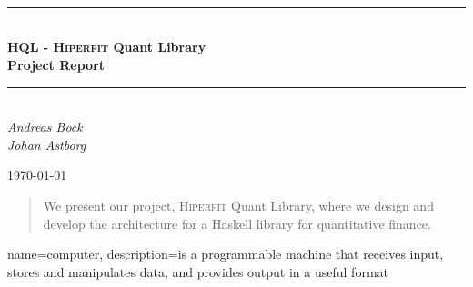 \documentclass[a4paper,11pt]{scrreprt}
\def\Title{\bf HQL - \textsc{Hiperfit} Quant Library\\ {\Large Project Report}}
\newcommand{\HRule}{\rule{\linewidth}{0.5mm}}
\begin{document}
\begin{titlepage}

\textsc{\LARGE }\\[1.5cm]
\textsc{\Large }\\[0.5cm]
\textsc{\large }\\[0.5cm]
 
\begin{center}
\HRule \\[0.5cm]
\huge \bfseries \Title\\[0.5cm]
\HRule \\[0.5cm]

\normalfont 
\Large
\textit{Andreas Bock \\ Johan Astborg }\\[3cm]


\date{\today}



{\today}\\[4cm]
 
\vfill
\end{center}

\end{titlepage}
\begin{abstract}

We present our project, \textsc{Hiperfit} Quant Library, where we design and develop the architecture for a Haskell library for quantitative finance.

\end{abstract}
\tableofcontents
\listoftables
{}
\listoffigures










{
  name=computer,
    description={is a programmable machine that receives input,
                   stores and manipulates data, and provides
                                  output in a useful format}
}
\end{document}
